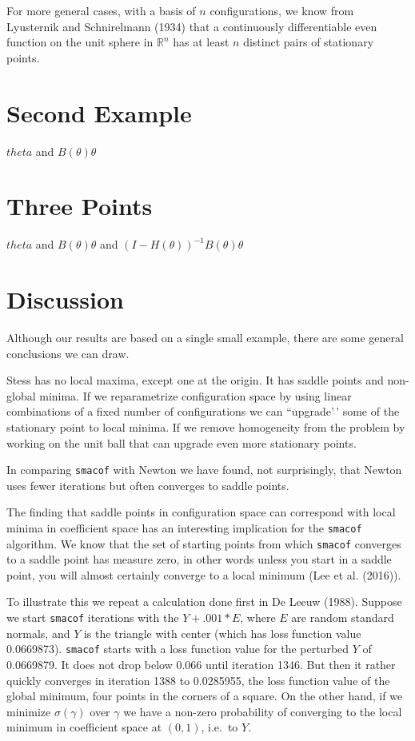 \documentclass[
  12pt,
]{article}
\begin{document}
For more general cases, with a basis of \(n\) configurations, we know from Lyusternik and Schnirelmann (1934) that a continuously differentiable even function on the unit sphere in \(\mathbb{R}^n\) has at least \(n\) distinct pairs of stationary points.

\section{Second Example}\label{second-example}

\(theta\) and \(B(\theta)\theta\)

\section{Three Points}\label{three-points}

\(theta\) and \(B(\theta)\theta\) and \((I - H(\theta))^{-1}B(\theta)\theta\)

\section{Discussion}\label{discussion}

Although our results are based on a single small example, there are some general conclusions we can draw.

Stess has no local maxima, except one at the origin. It has saddle points and non-global minima. If we reparametrize configuration space by using linear combinations of a fixed number of configurations we can ``upgrade'\,' some of the stationary point to local minima. If we remove homogeneity from the problem by working on the unit ball that can upgrade even more stationary points.

In comparing \texttt{smacof} with Newton we have found, not surprisingly, that Newton uses fewer iterations but often converges to saddle points.

The finding that saddle points in configuration space can correspond with local minima in coefficient space has an interesting implication for the \texttt{smacof} algorithm. We know that the set of starting points from which \texttt{smacof} converges to a saddle point has measure zero, in other words unless you start in a saddle point, you will almost certainly converge to a local minimum (Lee et al. (2016)).

To illustrate this we repeat a calculation done first in De Leeuw (1988). Suppose we start \texttt{smacof} iterations with the
\(Y+.001*E\), where \(E\) are random standard normals, and \(Y\) is the triangle with center (which has loss function value 0.0669873). \texttt{smacof} starts with a loss function value for the perturbed \(Y\) of 0.0669879. It does not drop below 0.066 until iteration 1346. But then it rather quickly converges in iteration 1388 to 0.0285955, the loss function value of the global minimum, four points in the corners of a square. On the other hand, if we minimize \(\sigma(\gamma)\) over \(\gamma\) we have a non-zero probability of converging to the local minimum in coefficient space at \((0,1)\), i.e.~to \(Y\).
\end{document}

